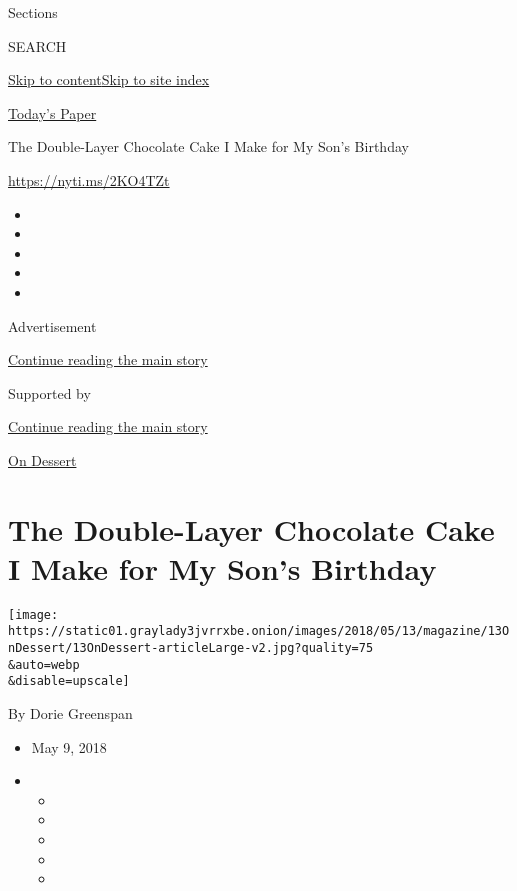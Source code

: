 Sections

SEARCH

\protect\hyperlink{site-content}{Skip to
content}\protect\hyperlink{site-index}{Skip to site index}

\href{https://myaccount.nytimes3xbfgragh.onion/auth/login?response_type=cookie\&client_id=vi}{}

\href{https://www.nytimes3xbfgragh.onion/section/todayspaper}{Today's
Paper}

The Double-Layer Chocolate Cake I Make for My Son's Birthday

\url{https://nyti.ms/2KO4TZt}

\begin{itemize}
\item
\item
\item
\item
\item
\end{itemize}

Advertisement

\protect\hyperlink{after-top}{Continue reading the main story}

Supported by

\protect\hyperlink{after-sponsor}{Continue reading the main story}

\href{/column/on-dessert}{On Dessert}

\hypertarget{the-double-layer-chocolate-cake-i-make-for-my-sons-birthday}{%
\section{The Double-Layer Chocolate Cake I Make for My Son's
Birthday}\label{the-double-layer-chocolate-cake-i-make-for-my-sons-birthday}}

\texttt{[image: https://static01.graylady3jvrrxbe.onion/images/2018/05/13/magazine/13OnDessert/13OnDessert-articleLarge-v2.jpg?quality=75\\\&auto=webp\\\&disable=upscale]}

By Dorie Greenspan

\begin{itemize}
\item
  May 9, 2018
\item
  \begin{itemize}
  \item
  \item
  \item
  \item
  \item
  \end{itemize}
\end{itemize}

